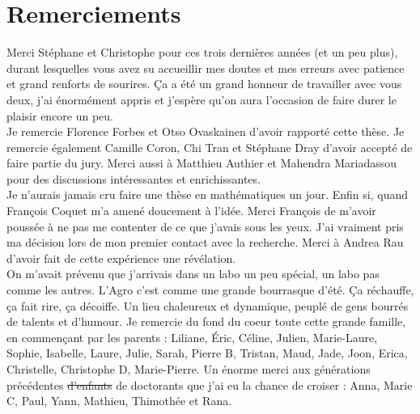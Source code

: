 


 
\newcommand{\nocontentsline}[3]{}
\newcommand{\tocless}[2]{\bgroup\let\addcontentsline=\nocontentsline#1{#2}\egroup}
\setcounter{chapter}{-1}


\frontmatter

 \clearemptydoublepage
\setcounter{tocdepth}{1}
\dominitoc
\nomtcrule
 \clearemptydoublepage
 \newpage
 \chapter*{Remerciements}
 
  Merci Stéphane et Christophe pour ces trois dernières années (et un peu plus), durant lesquelles vous avez su accueillir mes doutes et mes erreurs avec patience et grand renforts de sourires. Ça a été un grand honneur de travailler avec vous deux, j'ai énormément appris et j'espère qu'on aura l'occasion de faire durer le plaisir encore un peu.\\


 Je remercie Florence Forbes et Otso Ovaskainen d'avoir rapporté cette thèse. Je remercie également Camille Coron, Chi Tran et Stéphane Dray d'avoir accepté de faire partie du jury.  Merci  aussi à Matthieu Authier et Mahendra Mariadassou pour des discussions intéressantes et enrichissantes.\\
 
 Je n'aurais jamais cru faire une thèse en mathématiques un jour. Enfin si, quand François Coquet m'a amené doucement à l'idée. Merci François de m'avoir poussée à ne pas me contenter de ce que j'avais sous les yeux. J'ai vraiment pris ma décision lors de mon premier contact avec la recherche. Merci à Andrea Rau d'avoir fait de cette expérience une révélation.\\

 
 On m'avait prévenu que j'arrivais dans un labo un peu spécial, un labo pas comme les autres.  L'Agro c'est comme une grande bourrasque d'été. Ça réchauffe, ça fait rire, ça décoiffe. Un lieu chaleureux et dynamique, peuplé de gens bourrés de talents et d'humour. Je remercie du fond du coeur toute cette grande famille, en commençant par les parents : Liliane, Éric, Céline, Julien, Marie-Laure, Sophie, Isabelle, Laure, Julie, Sarah, Pierre B,  Tristan, Maud, Jade, Joon, Erica, Christelle, Christophe D, Marie-Pierre. Un énorme merci aux  générations précédentes \sout{d'enfants} de doctorants que j'ai eu la chance de croiser : Anna, Marie C, Paul, Yann, Mathieu, Thimothée et Rana. \\
 
